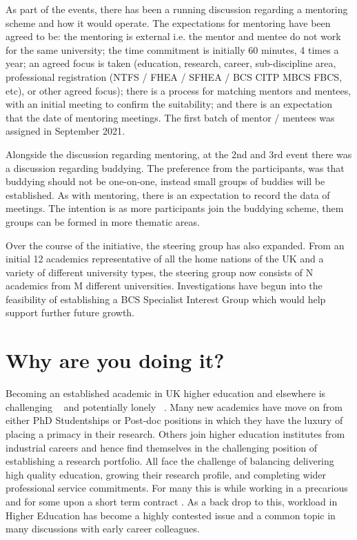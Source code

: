 \documentclass[sigconf]{acmart}
\begin{document}
As part of the events, there has been a running discussion regarding a mentoring scheme and how it would operate. The expectations for mentoring have been agreed to be: the mentoring is external i.e. the mentor and mentee do not work for the same university; the time commitment is initially 60 minutes, 4 times a year; an agreed focus is taken (education, research, career, sub-discipline area, professional registration (NTFS / FHEA / SFHEA / BCS CITP MBCS FBCS, etc), or other agreed focus); there is a process for matching mentors and mentees, with an initial meeting to confirm the suitability; and there is an expectation that the date of mentoring meetings. The first batch of mentor / mentees was assigned in September 2021. 

Alongside the discussion regarding mentoring, at the 2nd and 3rd event there was a discussion regarding buddying. The preference from the participants, was that buddying should not be one-on-one, instead small groups of buddies will be established. As with mentoring, there is an expectation to record the data of meetings. The intention is as more participants join the buddying scheme, them groups can be formed in more thematic areas. 

Over the course of the initiative, the steering group has also expanded. From an initial 12 academics representative of all the home nations of the UK and a variety of different university types, the steering group now consists of N academics from M different universities. Investigations have begun into the feasibility of establishing a BCS Specialist Interest Group \cite{BCSSIG} which would help support further future growth.




\section{Why are you doing it?}
Becoming an established academic in UK higher education and elsewhere is challenging ~\cite{Thomas2015} and potentially lonely ~\cite{Foote2009}. Many new academics have move on from either PhD Studentships or Post-doc positions in which they have the luxury of placing a primacy in their research. Others join higher education institutes from industrial careers and hence find themselves in the challenging position of establishing a research portfolio. All face the challenge of balancing delivering high quality education, growing their research profile, and completing wider professional service commitments. For many this is while working in a precarious and for some upon a short term contract \cite{UCU,JaffeS}. As a back drop to this, workload in Higher Education has become a highly contested issue \cite{UCU2016}and a common topic in many discussions with early career colleagues.
\end{document}
